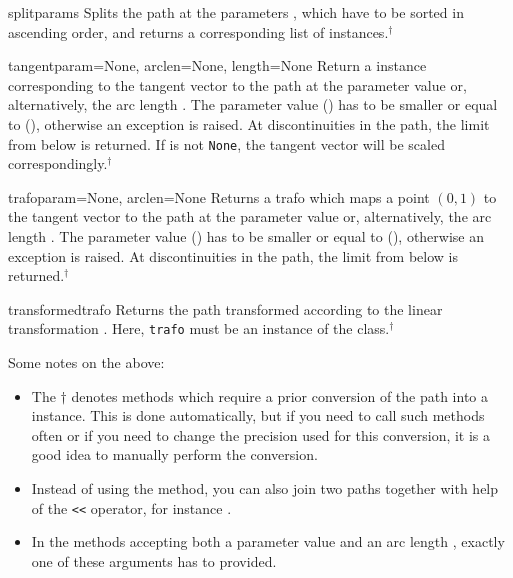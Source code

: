 \begin{methoddesc}{split}{params}
  Splits the path at the parameters , which have to be
  sorted in ascending order, and returns a corresponding list of
   instances.$^\dagger$
\end{methoddesc}

\begin{methoddesc}{tangent}{param=None, arclen=None, length=None}
  Return a  instance corresponding to the tangent vector
  to the path at the parameter value  or, alternatively, the arc length
  . The parameter value  () has to be smaller
  or equal to  (),
  otherwise an exception is raised.  At discontinuities in the path,
  the limit from below is returned. If  is not
  \texttt{None}, the tangent vector will be scaled correspondingly.$^\dagger$
\end{methoddesc}


\begin{methoddesc}{trafo}{param=None, arclen=None}
  Returns a trafo which maps a point $(0, 1)$ to the tangent vector to
  the path at the parameter value  or, alternatively, the
  arc length .  The parameter value  () has to
  be smaller or equal to 
  (), otherwise an exception is raised.  At
  discontinuities in the path, the limit from below is returned.$^\dagger$
\end{methoddesc}

\begin{methoddesc}{transformed}{trafo}
  Returns the path transformed according to the linear transformation
  . Here, \texttt{trafo} must be an instance of the
   class.$^\dagger$
\end{methoddesc}

Some notes on the above:
\begin{itemize}
\item The $\dagger$ denotes methods which require a prior
  conversion of the path into a  instance. This is
  done automatically, but if you need to call such methods often or
  if you need to change the precision used for this conversion, 
  it is a good idea to manually perform the conversion.
\item Instead of using the  method, you can also join two
paths together with help of the \verb|<<| operator, for instance
.
\item In the methods accepting both a parameter value  and
  an arc length , exactly one of these arguments has to
  provided.
\end{itemize}

